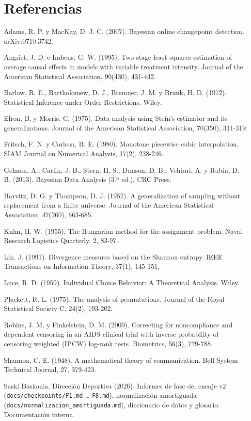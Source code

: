 \documentclass[10pt,a4paper]{article}
\begin{document}
\section*{Referencias}
\begin{enumerate}[label={[\arabic*]}]
  \item Adams, R. P. y MacKay, D. J. C. (2007). Bayesian online changepoint detection. arXiv:0710.3742.
  \item Angrist, J. D. e Imbens, G. W. (1995). Two-stage least squares estimation of average causal effects in models with variable treatment intensity. Journal of the American Statistical Association, 90(430), 431-442.
  \item Barlow, R. E., Bartholomew, D. J., Bremner, J. M. y Brunk, H. D. (1972). Statistical Inference under Order Restrictions. Wiley.
  \item Efron, B. y Morris, C. (1975). Data analysis using Stein's estimator and its generalizations. Journal of the American Statistical Association, 70(350), 311-319.
  \item Fritsch, F. N. y Carlson, R. E. (1980). Monotone piecewise cubic interpolation. SIAM Journal on Numerical Analysis, 17(2), 238-246.
  \item Gelman, A., Carlin, J. B., Stern, H. S., Dunson, D. B., Vehtari, A. y Rubin, D. B. (2013). Bayesian Data Analysis (3.ª ed.). CRC Press.
  \item Horvitz, D. G. y Thompson, D. J. (1952). A generalization of sampling without replacement from a finite universe. Journal of the American Statistical Association, 47(260), 663-685.
  \item Kuhn, H. W. (1955). The Hungarian method for the assignment problem. Naval Research Logistics Quarterly, 2, 83-97.
  \item Lin, J. (1991). Divergence measures based on the Shannon entropy. IEEE Transactions on Information Theory, 37(1), 145-151.
  \item Luce, R. D. (1959). Individual Choice Behavior: A Theoretical Analysis. Wiley.
  \item Plackett, R. L. (1975). The analysis of permutations. Journal of the Royal Statistical Society C, 24(2), 193-202.
  \item Robins, J. M. y Finkelstein, D. M. (2000). Correcting for noncompliance and dependent censoring in an AIDS clinical trial with inverse probability of censoring weighted (IPCW) log-rank tests. Biometrics, 56(3), 779-788.
  \item Shannon, C. E. (1948). A mathematical theory of communication. Bell System Technical Journal, 27, 379-423.
  \item Saski Baskonia, Dirección Deportiva (2026). Informes de fase del encaje v2 (\texttt{docs/\allowbreak{}checkpoints/\allowbreak{}F1.md} \ldots{} \texttt{F8.md}), normalización amortiguada (\texttt{docs/\allowbreak{}normalizacion\_amortiguada.md}), diccionario de datos y glosario. Documentación interna.
\end{enumerate}
\end{document}
